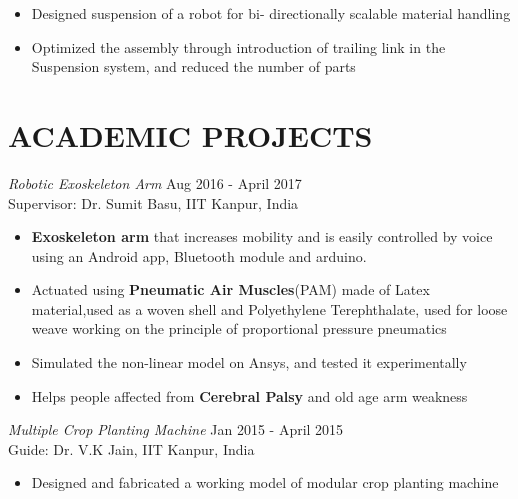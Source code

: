 \documentclass[margin, 10pt]{res} %
\begin{document}
\begin{resume}
\begin{itemize}
	\item Designed suspension of a robot for bi- directionally scalable material handling
	\item Optimized the assembly through introduction of trailing link in the Suspension system, and reduced the number of parts

	
\end{itemize} 
\clearpage


\section{ACADEMIC PROJECTS} 
{\sl{Robotic Exoskeleton Arm}  } \hfill Aug 2016 - April 2017 \\
Supervisor: Dr. Sumit Basu, IIT Kanpur, India\\
\begin{itemize}

\item \textbf{Exoskeleton arm} that increases mobility and is easily controlled by voice using an Android app, Bluetooth module and arduino.
\item Actuated using \textbf{Pneumatic Air Muscles}(PAM) made of Latex material,used as a woven shell and Polyethylene Terephthalate, used for loose weave working on the principle of proportional pressure  pneumatics
\item Simulated the non-linear model on Ansys, and tested it experimentally 
\item Helps people affected from \textbf{Cerebral Palsy} and old age arm weakness
\end{itemize}


{\sl Multiple Crop Planting Machine} \hfill Jan 2015 - April 2015 \\
Guide: Dr. V.K Jain, IIT Kanpur, India\\
\begin{itemize} %
\item Designed and fabricated a working model of modular crop planting machine


\end{itemize}
\end{resume}
\end{document}
